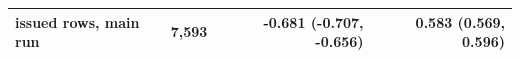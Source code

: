 \begin{tabular}{p{}rrr}
issued rows, main run & 7,593 & -0.681 (-0.707, -0.656) & 0.583 (0.569, 0.596) \\
\bottomrule
\end{tabular}
